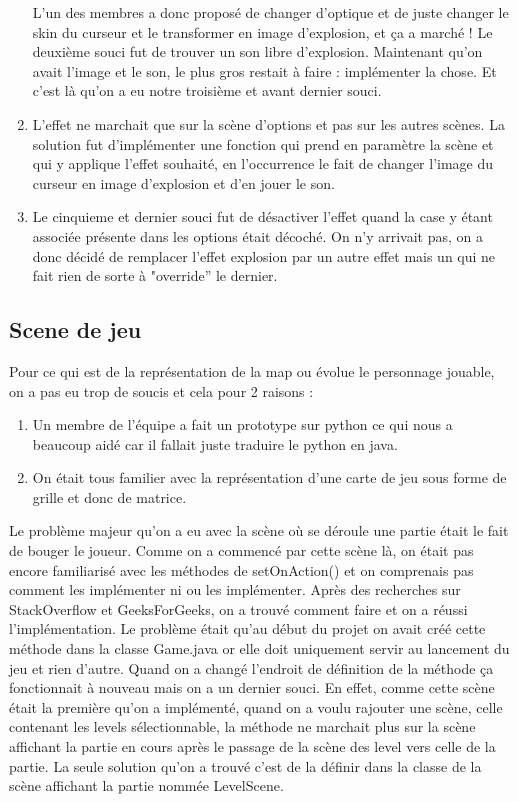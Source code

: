 \documentclass[../main.tex]{subfiles}
\begin{document}
\begin{enumerate}
L’un des membres a donc proposé de changer d’optique et de juste changer le skin du curseur et le transformer en image d’explosion, et ça a marché !
Le deuxième souci fut de trouver un son libre d’explosion. 
Maintenant qu’on avait l’image et le son, le plus gros restait à faire : implémenter la chose. Et c’est là qu’on a eu notre troisième et avant dernier souci.
    \item L’effet ne marchait que sur la scène d’options et pas sur les autres scènes.
La solution fut d'implémenter une fonction qui prend en paramètre la scène et qui y applique l'effet souhaité, en l'occurrence le fait de changer l’image du curseur en image d’explosion et d’en jouer le son.
    \item Le cinquieme et dernier souci fut de désactiver l’effet quand la case y étant associée présente dans les options était décoché.
On n'y arrivait pas, on a donc décidé de remplacer l’effet explosion par un autre effet mais un qui ne fait rien de sorte à "override” le dernier.
\end{enumerate}

\subsection{Scene de jeu}
Pour ce qui est de la représentation de la map ou évolue le personnage jouable, on a pas eu trop de soucis et cela pour 2 raisons : 
\begin{enumerate}
    \item Un membre de l’équipe a fait un prototype sur python ce qui nous a beaucoup aidé car il fallait juste traduire le python en java.
    \item On était tous familier avec la représentation d’une carte de jeu sous forme de grille et donc de matrice.
\end{enumerate}
Le problème majeur qu’on a eu avec la scène où se déroule une partie était le fait de bouger le joueur.
Comme on a commencé par cette scène là, on était pas encore familiarisé avec les méthodes de setOnAction() et on comprenais pas comment les implémenter ni ou les implémenter.
Après des recherches sur StackOverflow et GeeksForGeeks, on a trouvé comment faire et on a réussi l’implémentation.
Le problème était qu’au début du projet on avait créé cette méthode dans la classe Game.java or elle doit uniquement servir au lancement du jeu et rien d'autre.
Quand on a changé l’endroit de définition de la méthode ça fonctionnait à nouveau mais on a un dernier souci.
En effet, comme cette scène était la première qu’on a implémenté, quand on a voulu rajouter une scène, celle contenant les levels sélectionnable, la méthode ne marchait plus sur la scène affichant la partie en cours après le passage de la scène des level vers celle de la partie.
La seule solution qu’on a trouvé c’est de la définir dans la classe de la scène affichant la partie nommée LevelScene.
\end{document}
